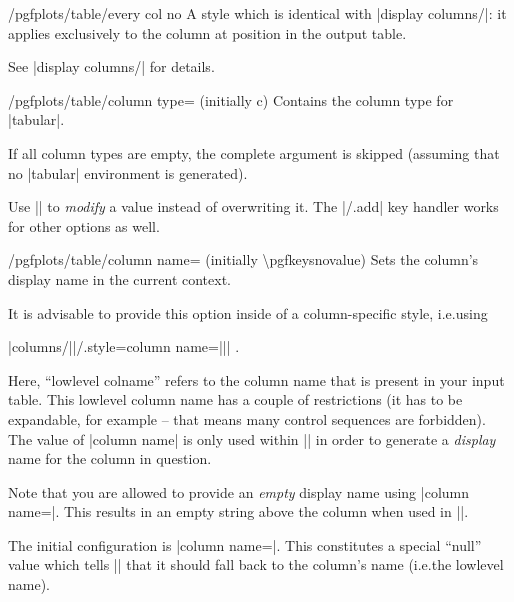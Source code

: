\begin{stylekey}{/pgfplots/table/every col no }
    A style which is identical with |display columns/|: it applies
    exclusively to the column at position  in the output table.

    See |display columns/| for details.
\end{stylekey}

\begin{key}{/pgfplots/table/column type= (initially c)}
    Contains the column type for |tabular|.

    If all column types are empty, the complete argument is skipped (assuming
    that no |tabular| environment is generated).

    Use || to
    \emph{modify} a value instead of overwriting it. The |/.add| key handler
    works for other options as well.
\begin{codeexample}[pre={\begin{lateximage}},post={\end{lateximage}},narrow]
\end{codeexample}
\end{key}

\begin{key}{/pgfplots/table/column name= (initially \textbackslash pgfkeysnovalue)}
    Sets the column's display name in the current context.

    It is advisable to provide this option inside of a column-specific style,
    i.e.\@ using

    |columns/||/.style={column name=||}| .

    Here, ``lowlevel colname'' refers to the column name that is present in
    your input table. This lowlevel column name has a couple of restrictions
    (it has to be expandable, for example -- that means many control sequences
    are forbidden). The value of |column name| is only used within
    |\pgfplotstabletypeset| in order to generate a \emph{display} name for the
    column in question.

    Note that you are allowed to provide an \emph{empty} display name using
    |column name={}|. This results in an empty string above the column when
    used in |\pgfplotstabletypeset|.

    The initial configuration is |column name=\pgfkeysnovalue|. This
    constitutes a special ``null'' value which tells |\pgfplotstabletypeset|
    that it should fall back to the column's name (i.e.\@ the lowlevel name).
\end{key}

